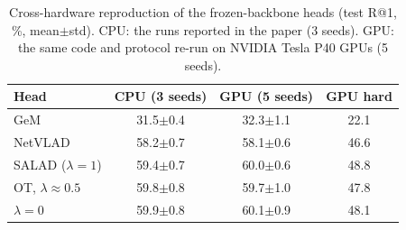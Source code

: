 \begin{table}[t]
\centering
\caption{Cross-hardware reproduction of the frozen-backbone heads (test R@1, \%, mean$\pm$std). CPU: the runs reported in the paper (3 seeds). GPU: the same code and protocol re-run on NVIDIA Tesla P40 GPUs (5 seeds).}
\label{tab:repro}
\footnotesize
\begin{tabular}{@{}lccc@{}}
\toprule
Head & CPU (3 seeds) & GPU (5 seeds) & GPU hard \\
\midrule
GeM & 31.5{\scriptsize$\pm$0.4} & 32.3{\scriptsize$\pm$1.1} & 22.1 \\
NetVLAD & 58.2{\scriptsize$\pm$0.7} & 58.1{\scriptsize$\pm$0.6} & 46.6 \\
SALAD ($\lambda{=}1$) & 59.4{\scriptsize$\pm$0.7} & 60.0{\scriptsize$\pm$0.6} & 48.8 \\
OT, $\lambda{\approx}0.5$ & 59.8{\scriptsize$\pm$0.8} & 59.7{\scriptsize$\pm$1.0} & 47.8 \\
$\lambda=0$ & 59.9{\scriptsize$\pm$0.8} & 60.1{\scriptsize$\pm$0.9} & 48.1 \\
\bottomrule
\end{tabular}
\end{table}